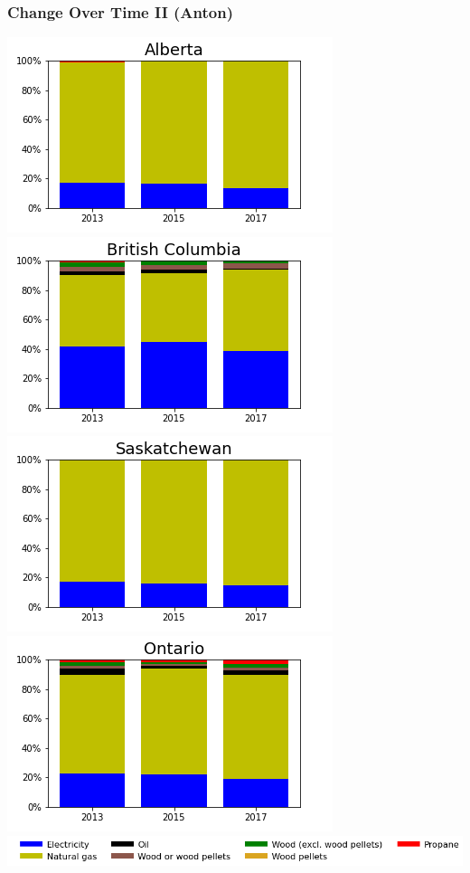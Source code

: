 \documentclass{beamer}
\begin{document}
\begin{frame}
\frametitle{Change Over Time II (Anton)}
\vspace{-10pt}
\begin{center}
\includegraphics[width=0.48\linewidth]{ab.png}%
\includegraphics[width=0.48\linewidth]{bc.png}\\
\includegraphics[width=0.48\linewidth]{sk.png}%
\includegraphics[width=0.48\linewidth]{on.png}\\
\includegraphics[width=0.9\linewidth]{leg_bar.png}
\end{center}
\end{frame}
\end{document}
